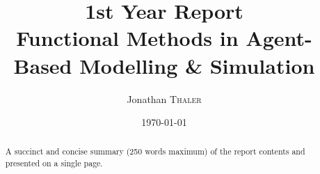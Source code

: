 \documentclass{article}
\title{1st Year Report \\ Functional Methods in Agent-Based Modelling \& Simulation} %
\author{Jonathan \textsc{Thaler}} %
\date{\today} %
\begin{document}
\maketitle %

\begin{abstract}
A succinct and concise summary (250 words maximum) of the report contents and presented on a single page.
\end{abstract}










%



\end{document}
